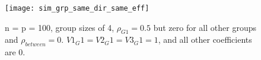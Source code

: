 \begin{figure}[hbtp]
    \begin{center}
    \texttt{[image: sim\_grp\_same\_dir\_same\_eff]}
    \caption{\label{Fig:ssim_grp_same_dir_same_eff} n = p = 100, group sizes of 4, $\rho_{G1} = 0.5$ but zero for all other groups and $\rho_{between} = 0$. $V1_G1 = V2_G1 = V3_G1 = 1$, and all other coefficients are 0.}
    \end{center}
\end{figure}